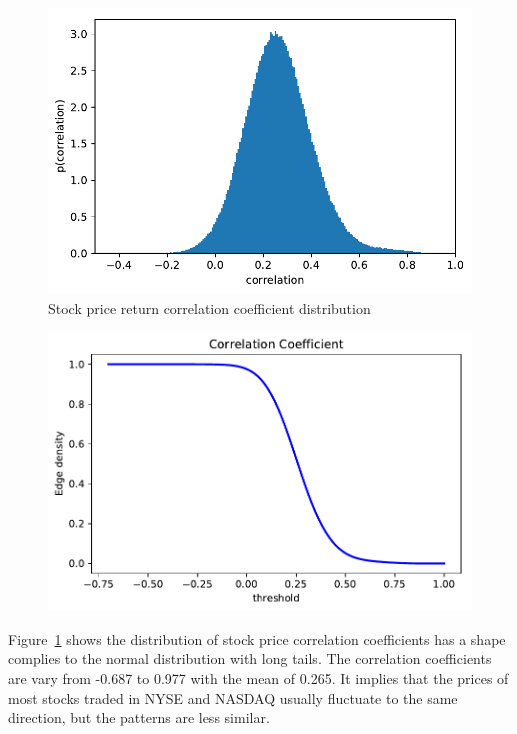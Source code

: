 \begin{figure}
	\begin{center}
		\includegraphics[width=14cm]{correlation_distribution}
	\end{center}
	\caption{Stock price return correlation coefficient distribution}
	\label{fig:correlation_distribution}  
\end{figure}

\begin{figure}
	\begin{center}
		\includegraphics[width=14cm]{correlation_edge_density}
	\end{center}
	\caption{}
	\label{fig:correlation_edge_density}  
\end{figure}

Figure~\ref{fig:correlation_distribution} shows the distribution of stock price correlation coefficients has a shape complies to the normal distribution with long tails. The correlation coefficients are vary from -0.687 to 0.977 with the mean of 0.265. It implies that the prices of most stocks traded in NYSE and NASDAQ usually fluctuate to the same direction, but the patterns are less similar.

